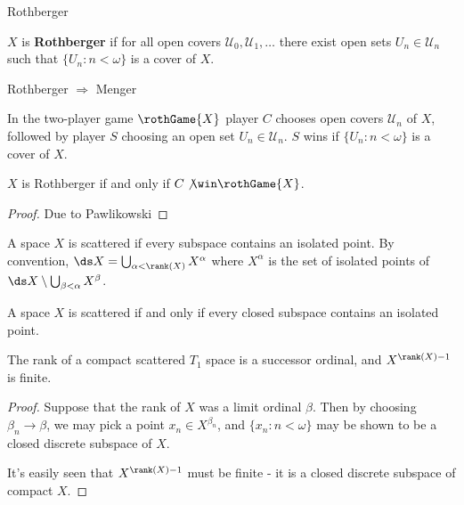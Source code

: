 \newpage

  \centerline{Rothberger}

  \begin{defn}
    $X$ is \textbf{Rothberger} if for all open covers $\mathcal{U}_0,\mathcal{U}_1,\dots$ there exist open sets $U_n\in \mathcal{U}_n$ such that $\{U_n:n<\omega\}$ is a cover of $X$.
  \end{defn}

  \begin{prop}
    Rothberger $\Rightarrow$ Menger
  \end{prop}

  \begin{defn}
    In the two-player game $\rothGame{X}$ player $C$ chooses open covers $\mathcal{U}_n$ of $X$, followed by player $S$ choosing an open set $U_n\in\mathcal{U}_n$. $S$ wins if $\{U_n:n<\omega\}$ is a cover of $X$.
  \end{defn}

  \begin{thm}
    $X$ is Rothberger if and only if $C\not\win\rothGame{X}$.
  \end{thm}

  \begin{proof}
    Due to Pawlikowski
  \end{proof}

  \begin{defn}
    A space $X$ is scattered if every subspace contains an isolated point. By convention, $\ds X = \bigcup_{\alpha<\rank(X)}X^\alpha$ where $X^\alpha$ is the set of isolated points of $\ds X\setminus\bigcup_{\beta<\alpha}X^\beta$.
  \end{defn}

  \begin{prop}
    A space $X$ is scattered if and only if every closed subspace contains an isolated point.
  \end{prop}

  \begin{prop}
    The rank of a compact scattered $T_1$ space is a successor ordinal, and $X^{\rank(X)-1}$ is finite.
  \end{prop}

  \begin{proof}
    Suppose that the rank of $X$ was a limit ordinal $\beta$. Then by choosing $\beta_n\to\beta$, we may pick a point $x_n\in X^{\beta_n}$, and $\{x_n: n<\omega\}$ may be shown to be a closed discrete subspace of $X$.

    It's easily seen that $X^{\rank(X)-1}$ must be finite - it is a closed discrete subspace of compact $X$.
  \end{proof}

